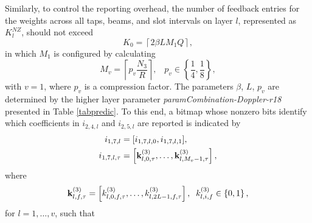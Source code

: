 \documentclass[lettersize,journal]{IEEEtran}
\begin{document}
Similarly, to control the reporting overhead, the number of feedback entries for the weights across all taps, beams, and slot intervals on layer $l$, represented as \( K_l^{NZ} \), should not exceed
\begin{equation}
K_0=\left\lceil2\beta LM_1Q\right\rceil ,   
\end{equation}
in which  \( M_1 \) is configured by calculating
\begin{equation}\label{a66}
 M_v  = \left\lceil {{p_v }\frac{{{N_3}}}{R}} \right\rceil, \;\;\;{p_v} \in \left\{ {\frac{1}{4},\frac{1}{8}} \right\},
\end{equation}
with $v=1$, where ${p_v}$ is a compression factor. The parameters $\beta$, $L$, $p_v$ are determined by the higher layer parameter \emph{paramCombination-Doppler-r18} presented in Table \ref{tabpredic}. To this end, a bitmap whose nonzero bits identify which coefficients in $i_{2,4,l}$ and $i_{2,5,l}$ are reported is indicated by 
\begin{equation}
\begin{aligned}
 i_{1,7,l}&=[i_{1,7,l,0}, i_{1,7,l,1}],\\
 i_{1,7,l,\tau}&=\left[{\bf{k}}_{l,0,\tau}^{\left(3\right)},\ldots, {\bf{k}}_{l,M_v-1,\tau}^{\left(3\right)}\right],   
\end{aligned} 
\end{equation}
where 
\begin{equation}
 {\bf{k}}_{l,f,\tau}^{\left(3\right)}=\left[k_{l,0,f,\tau}^{\left(3\right)},\ldots, k_{l,2L-1,f,\tau}^{\left(3\right)}\right], \;\;  k_{l,i,f}^{(3)}\in\left\{0,1\right\},
\end{equation}
for $l=1,\ldots,v$, such that
\end{document}
